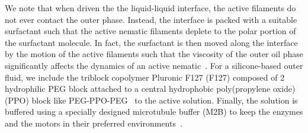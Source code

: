 We note that when driven the the liquid-liquid interface, the active filaments do not ever contact the outer phase.
Instead, the interface is packed with a suitable surfactant such that the active nematic filaments deplete to the polar portion of the surfactant molecule.
In fact, the surfactant is then moved along the interface by the motion of the active filaments such that the viscosity of the outer oil phase significantly affects the dynamics of an active nematic~\cite{RN135}.
For a silicone-based outer fluid, we include the triblock copolymer Pluronic F127 (F127) composed of 2 hydrophilic PEG block attached to a central hydrophobic poly(propylene oxide) (PPO) block like PEG-PPO-PEG~\cite{RN252} to the active solution.
Finally, the solution is buffered using a specially designed microtubule buffer (M2B) to keep the enzymes and the motors in their preferred environments~\cite{RN3}.\\

